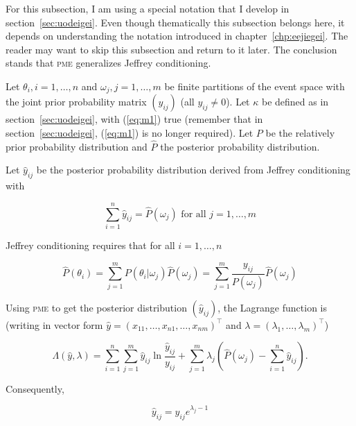 \documentclass[phd,12pt,oneside]{ubcthesis}
\begin{document}
For this subsection, I am using a special notation that I develop in
section~\ref{sec:uodeigei}. Even though thematically this subsection
belongs here, it depends on understanding the notation introduced in
chapter~\ref{chp:eejiegei}. The reader may want to skip this
subsection and return to it later. The conclusion stands that
\textsc{pme} generalizes Jeffrey conditioning. 

Let $\theta_{i},i=1,\ldots,n$ and $\omega_{j},j=1,\ldots,m$ be finite
partitions of the event space with the joint prior probability matrix
$(y_{ij})$ (all $y_{ij}\neq{}0$). Let $\kappa$ be defined as in
section~\ref{sec:uodeigei}, with (\ref{eq:m1}) true (remember that in
section~\ref{sec:uodeigei}, (\ref{eq:m1}) is no longer required). Let
$P$ be the relatively prior probability distribution and $\hat{P}$ the
posterior probability distribution.

Let $\hat{y}_{ij}$ be the posterior probability distribution derived
from Jeffrey conditioning with

\begin{equation}
  \label{eq:jc1}
  \sum_{i=1}^{n}\hat{y}_{ij}=\hat{P}(\omega_{j})\mbox{ for all }j=1,\ldots,m
\end{equation}

{\noindent}Jeffrey conditioning requires that for all $i=1,\ldots,n$

\begin{equation}
  \label{eq:jc2}
  \hat{P}(\theta_{i})=\sum_{j=1}^{m}P(\theta_{i}|\omega_{j})\hat{P}(\omega_{j})=\sum_{j=1}^{m}\frac{y_{ij}}{P(\omega_{j})}\hat{P}(\omega_{j})
\end{equation}

{\noindent}Using \textsc{pme} to get the posterior distribution
$(\hat{y}_{ij})$, the Lagrange function is (writing in vector form
$\hat{y}=(x_{11},\ldots,x_{n1},\ldots,x_{nm})^{\top}$ and
$\lambda=(\lambda_{1},\ldots,\lambda_{m})^{\top}$)

\begin{equation}
  \label{eq:jclag}
  \Lambda(\hat{y},\lambda)=\sum_{i=1}^{n}\sum_{j=1}^{m}\hat{y}_{ij}\ln\frac{\hat{y}_{ij}}{y_{ij}}+\sum_{j=1}^{m}\lambda_{j}\left(\hat{P}(\omega_{j})-\sum_{i=1}^{n}\hat{y}_{ij}\right).
\end{equation}

{\noindent}Consequently,

\begin{equation}
  \label{eq:jc4}
  \hat{y}_{ij}=y_{ij}e^{\lambda_{j}-1}
\end{equation}
\end{document}
